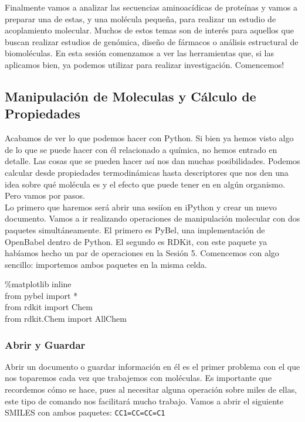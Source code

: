 \documentclass[10pt,letterpaper]{article}
\newcommand{\inlinecode}[1]{
\colorbox{light-gray}{\texttt{#1}}
}
\newenvironment{Code}
{
\begin{lrbox}{\selvestebox}%
\begin{minipage}{\dimexpr\columnwidth-2\fboxsep\relax}
\fontfamily{\ttdefault}\selectfont
}
{\end{minipage}\end{lrbox}%
\begin{center}
\colorbox{light-gray}{\usebox{\selvestebox}}
\end{center}
}
\begin{document}
Finalmente vamos a analizar las secuencias aminoac\'idicas de prote\'inas y vamos a preparar una de estas, y una mol\'ecula peque\~na, para realizar un estudio de acoplamiento molecular. Muchos de estos temas son de inter\'es para aquellos que buscan realizar estudios de gen\'omica, dise\~no de f\'armacos o an\'alisis estructural de biomol\'eculas. En esta sesi\'on comenzamos a ver las herramientas que, si las aplicamos bien, ya podemos utilizar para realizar investigaci\'on. Comencemos!

\subsection{Manipulaci\'on de Moleculas y C\'alculo de Propiedades}

Acabamos de ver lo que podemos hacer con Python. Si bien ya hemos visto algo de lo que se puede hacer con \'el relacionado a qu\'imica, no hemos entrado en detalle. Las cosas que se pueden hacer as\'i nos dan muchas posibilidades. Podemos calcular desde propiedades termodin\'amicas hasta descriptores que nos den una idea sobre qu\'e mol\'ecula es y el efecto que puede tener en en alg\'un organismo. Pero vamos por pasos.\\

Lo primero que haremos ser\'a abrir una sesi\'ion en iPython y crear un nuevo documento. Vamos a ir realizando operaciones de manipulaci\'on molecular con dos paquetes simult\'aneamente. El primero es PyBel, una implementaci\'on de OpenBabel dentro de Python. El segundo es RDKit, con este paquete ya hab\'iamos hecho un par de operaciones en la Sesi\'on 5. Comencemos con algo sencillo: importemos ambos paquetes en la misma celda.

\begin{Code}
\%matplotlib inline\\
from pybel import *\\
from rdkit import Chem\\
from rdkit.Chem import AllChem
\end{Code}

\subsubsection{Abrir y Guardar}
Abrir un documento o guardar informaci\'on en \'el es el primer problema con el que nos toparemos cada vez que trabajemos con mol\'eculas. Es importante que recordemos c\'omo se hace, pues al necesitar alguna operaci\'on sobre miles de ellas, este tipo de comando nos facilitar\'a mucho trabajo. Vamos a abrir el siguiente SMILES con ambos paquetes: \inlinecode{CC1=CC=CC=C1}\\
\end{document}

